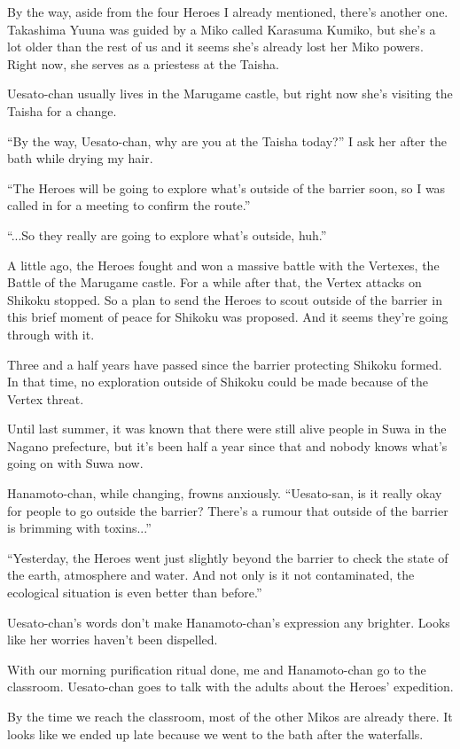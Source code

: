 By the way, aside from the four Heroes I already mentioned, there's another one. Takashima Yuuna was guided by a Miko called Karasuma Kumiko, but she's a lot older than the rest of us and it seems she's already lost her Miko powers. Right now, she serves as a priestess at the Taisha.

Uesato-chan usually lives in the Marugame castle, but right now she's visiting the Taisha for a change.

``By the way, Uesato-chan, why are you at the Taisha today?'' I ask her after the bath while drying my hair.

``The Heroes will be going to explore what's outside of the barrier soon, so I was called in for a meeting to confirm the route.''

``...So they really are going to explore what's outside, huh.''

A little ago, the Heroes fought and won a massive battle with the Vertexes, the Battle of the Marugame castle. For a while after that, the Vertex attacks on Shikoku stopped. So a plan to send the Heroes to scout outside of the barrier in this brief moment of peace for Shikoku was proposed. And it seems they're going through with it.

Three and a half years have passed since the barrier protecting Shikoku formed. In that time, no exploration outside of Shikoku could be made because of the Vertex threat.

Until last summer, it was known that there were still alive people in Suwa in the Nagano prefecture, but it's been half a year since that and nobody knows what's going on with Suwa now.

Hanamoto-chan, while changing, frowns anxiously.  ``Uesato-san, is it really okay for people to go outside the barrier? There's a rumour that outside of the barrier is brimming with toxins...''

``Yesterday, the Heroes went just slightly beyond the barrier to check the state of the earth, atmosphere and water. And not only is it not contaminated, the ecological situation is even better than before.''

Uesato-chan's words don't make Hanamoto-chan's expression any brighter. Looks like her worries haven't been dispelled.

With our morning purification ritual done, me and Hanamoto-chan go to the classroom. Uesato-chan goes to talk with the adults about the Heroes' expedition.

By the time we reach the classroom, most of the other Mikos are already there. It looks like we ended up late because we went to the bath after the waterfalls.

